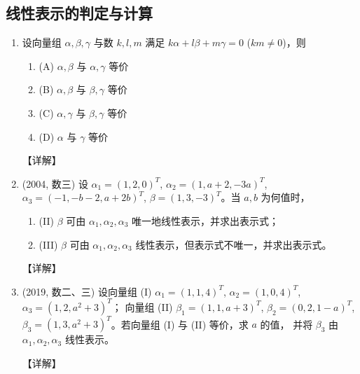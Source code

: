 \documentclass[12pt, a4paper, oneside, UTF8]{ctexbook}
\begin{document}
\subsection{线性表示的判定与计算}

\begin{enumerate}[label=\arabic*.]
    \item 设向量组 $\alpha, \beta, \gamma$ 与数 $k, l, m$ 满足 $k\alpha + l\beta + m\gamma = 0$ ($km \neq 0$)，则
    \begin{enumerate}
        \item (A) $\alpha, \beta$ 与 $\alpha, \gamma$ 等价
        \item (B) $\alpha, \beta$ 与 $\beta, \gamma$ 等价
        \item (C) $\alpha, \gamma$ 与 $\beta, \gamma$ 等价
        \item (D) $\alpha$ 与 $\gamma$ 等价
    \end{enumerate}
    
    \begin{solution}
    【详解】
    \end{solution}
    
    \item (2004, 数三) 设 $\alpha_1 = (1,2,0)^T$, $\alpha_2 = (1, a+2, -3a)^T$, $\alpha_3 = (-1, -b-2, a+2b)^T$,
    $\beta = (1,3,-3)^T$。当 $a, b$ 为何值时，
    \begin{enumerate}
        \item (II) $\beta$ 可由 $\alpha_1, \alpha_2, \alpha_3$ 唯一地线性表示，并求出表示式；
        \item (III) $\beta$ 可由 $\alpha_1, \alpha_2, \alpha_3$ 线性表示，但表示式不唯一，并求出表示式。
    \end{enumerate}
    
    \begin{solution}
    【详解】
    \end{solution}
    
    \item (2019, 数二、三) 设向量组 (I) $\alpha_1 = (1,1,4)^T$, $\alpha_2 = (1,0,4)^T$, $\alpha_3 = (1,2, a^2+3)^T$；
    向量组 (II) $\beta_1 = (1,1, a+3)^T$, $\beta_2 = (0,2,1-a)^T$, $\beta_3 = (1,3, a^2+3)^T$。若向量组 (I) 与 (II) 等价，求 $a$ 的值，
    并将 $\beta_3$ 由 $\alpha_1, \alpha_2, \alpha_3$ 线性表示。
    
    \begin{solution}
    【详解】
    \end{solution}
\end{enumerate}
\end{document}
